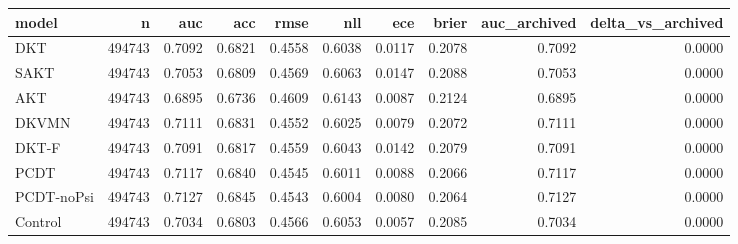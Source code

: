 \begin{tabular}{lrrrrrrrrr}
\toprule
model & n & auc & acc & rmse & nll & ece & brier & auc\_archived & delta\_vs\_archived \\
\midrule
DKT & 494743 & 0.7092 & 0.6821 & 0.4558 & 0.6038 & 0.0117 & 0.2078 & 0.7092 & 0.0000 \\
SAKT & 494743 & 0.7053 & 0.6809 & 0.4569 & 0.6063 & 0.0147 & 0.2088 & 0.7053 & 0.0000 \\
AKT & 494743 & 0.6895 & 0.6736 & 0.4609 & 0.6143 & 0.0087 & 0.2124 & 0.6895 & 0.0000 \\
DKVMN & 494743 & 0.7111 & 0.6831 & 0.4552 & 0.6025 & 0.0079 & 0.2072 & 0.7111 & 0.0000 \\
DKT-F & 494743 & 0.7091 & 0.6817 & 0.4559 & 0.6043 & 0.0142 & 0.2079 & 0.7091 & 0.0000 \\
PCDT & 494743 & 0.7117 & 0.6840 & 0.4545 & 0.6011 & 0.0088 & 0.2066 & 0.7117 & 0.0000 \\
PCDT-noPsi & 494743 & 0.7127 & 0.6845 & 0.4543 & 0.6004 & 0.0080 & 0.2064 & 0.7127 & 0.0000 \\
Control & 494743 & 0.7034 & 0.6803 & 0.4566 & 0.6053 & 0.0057 & 0.2085 & 0.7034 & 0.0000 \\
\bottomrule
\end{tabular}
